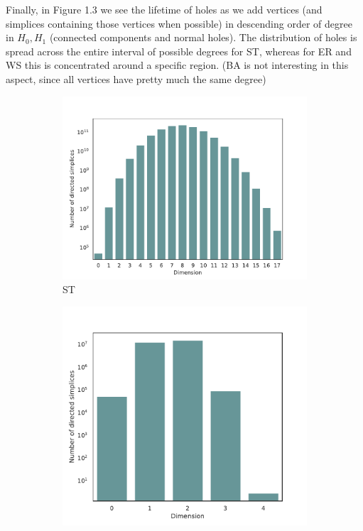 \documentclass[oneside,a4paper,12pt, DIV=calc]{scrbook}
\theoremstyle{definition}
\begin{document}
Finally, in Figure 1.3 we see the lifetime of holes as we add vertices (and simplices containing those vertices when possible) in descending order of degree in $H_{0},H_{1}$ (connected components and normal holes). The distribution of holes is spread across the entire interval of possible degrees for ST, whereas for ER and WS this is concentrated around a specific region. (BA is not interesting in this aspect, since all vertices have pretty much the same degree)
\begin{figure}[ht]
  \centering
  \begin{subfigure}{.49 \linewidth}
    \includegraphics[scale=0.45]{./counts/real50k_count.pdf}
    \caption{ST}
  \end{subfigure}%
  \begin{subfigure}{.49 \linewidth}
    \includegraphics[scale=0.405]{./counts/random50k.pdf}

\end{subfigure}
\end{figure}
\end{document}
